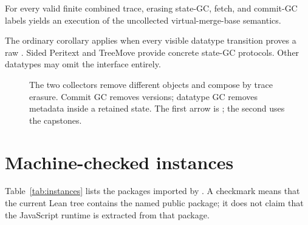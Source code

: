 \begin{theorem}
For every valid finite combined trace, erasing state-GC, fetch, and commit-GC
labels yields an execution of the uncollected virtual-merge-base semantics.
\hfill{}
\end{theorem}

The ordinary corollary  applies when every
visible datatype transition proves a raw . Sided Peritext and
TreeMove provide concrete state-GC protocols. Other datatypes may omit the
interface entirely.

\begin{figure}[H]
\centering
{}
\caption{The two collectors remove different objects and compose by trace
erasure. Commit GC removes versions; datatype GC removes metadata inside a
retained state. The first arrow is ; the second
uses the  capstones.}
\label{fig:two-gc-composition}
\end{figure}

\section{Machine-checked instances}

Table~\ref{tab:instances} lists the packages imported by
. A checkmark means that the current Lean
tree contains the named public package; it does not claim that the JavaScript
runtime is extracted from that package.

